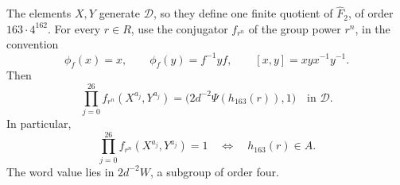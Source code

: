 \begin{proposition}
\label{prop:163-finite-word-detector}
The elements \(X,Y\) generate \(\mathscr D\), so they define
one finite quotient of \(\widehat F_2\), of order \(163\cdot4^{162}\).
For every \(r\in R\), use the conjugator \(f_{r^n}\) of the
group power \(r^n\), in the convention
\[
 \phi_f(x)=x,\qquad \phi_f(y)=f^{-1}yf,\qquad
 [x,y]=xyx^{-1}y^{-1}.
\]
Then
\begin{equation}
 \prod_{j=0}^{26}f_{r^n}(X^{a_j},Y^{a_j})
       =\bigl(2d^{-2}\Psi(h_{163}(r)),1\bigr)
       \quad\text{in }\mathscr D.
 \label{eq:163-exact-word-value}
\end{equation}
In particular,
\begin{equation}
 \prod_{j=0}^{26}f_{r^n}(X^{a_j},Y^{a_j})=1
       \quad\Longleftrightarrow\quad h_{163}(r)\in A.
 \label{eq:163-word-equivalence}
\end{equation}
The word value lies in \(2d^{-2}W\), a subgroup of order four.
\end{proposition}
